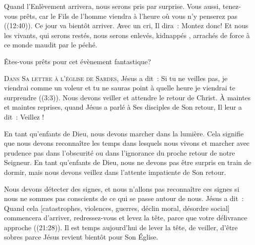 
Quand l'Enlèvement arrivera, nous serons pris par surprise.
 \og Vous aussi, tenez-vous prêts, car le Fils de l'homme viendra à l'heure
 où vous n'y penserez pas \fg{}  ((12:40)).
 Ce jour va bientôt arriver. Avec un cri, Il dira~: 
 \og Montez donc! \fg{} Et nous les vivants, qui serons restés,
 nous serons enlevés, \og kidnappés \fg{}, arrachés de force
 à ce monde maudit par le péché.

Êtes-vous prêts pour cet évènement fantastique?

\dvrule






\lettrine{D}{ans Sa lettre à l'église de Sardes,}
 Jésus a dit~: 
 \og Si tu ne veilles pas, je viendrai comme un voleur et tu ne sauras point
 à quelle heure je viendrai te surprendre \fg{} ((3:3)).
 Nous devons veiller et attendre le retour de Christ.
 À maintes et maintes reprises, quand Jésus a parlé à Ses disciples
 de Son retour, Il leur a dit~:  \og Veillez ! \fg{}


En tant qu'enfants de Dieu, nous devons marcher dans la lumière.
 Cela signifie que nous devons reconnaître les temps dans lesquels nous vivons
 et marcher avec prudence \ocadr pas dans l'obscurité ou dans l'ignorance
 du proche retour de notre Seigneur. En tant qu'enfants de Dieu,
 nous ne devons pas être surpris en train de dormir,
 mais nous devons veillez dans l'attente impatiente de Son retour.

Nous devons détecter des signes, et nous n'allons pas reconnaître ces signes
 si nous ne sommes pas conscients de ce qui se passe autour de nous.
 Jésus a dit~: 
 \og Quand cela [catastrophes, violences, guerres, déclin moral,
 désordre social] commencera d'arriver, redressez-vous et levez la tête,
 parce que votre délivrance approche \fg{} ((21:28)).
 Il est temps aujourd'hui de lever la tête, de veiller, d'être sobres
 \ocadr parce Jésus revient bientôt pour Son Église. 

